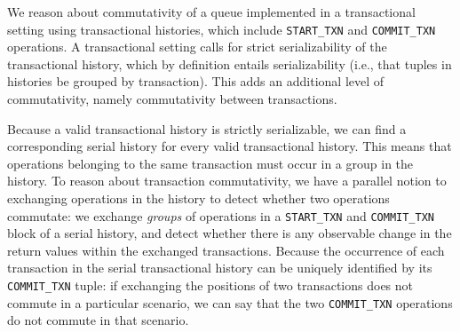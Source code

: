 We reason about commutativity of a queue implemented in a transactional setting using transactional histories, which include \texttt{START\_TXN} and \texttt{COMMIT\_TXN} operations. A transactional setting calls for strict serializability of the transactional history, which by definition entails serializability (i.e., that tuples in histories be grouped by transaction). This adds an additional level of commutativity, namely commutativity between transactions.

Because a valid transactional history is strictly serializable, we can find a corresponding serial history for every valid transactional history. This means that operations belonging to the same transaction must occur in a group in the history. To reason about transaction commutativity, we have a parallel notion to exchanging operations in the history to detect whether two operations commutate:  we exchange \emph{groups} of operations in a \texttt{START\_TXN} and \texttt{COMMIT\_TXN} block of a serial history, and detect whether there is any observable change in the return values within the exchanged transactions. Because the occurrence of each transaction in the serial transactional history can be uniquely identified by its \texttt{COMMIT\_TXN} tuple: if exchanging the positions of two transactions does not commute in a particular scenario, we can say that the two \texttt{COMMIT\_TXN} operations do not commute in that scenario.

